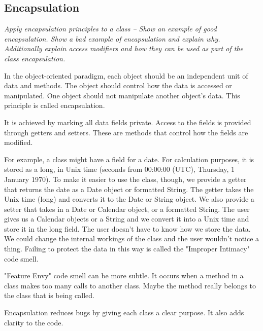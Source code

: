 \subsection{Encapsulation}
\textit{Apply encapsulation principles to a class -- Show an example of good encapsulation.  Show a bad example of encapsulation and explain why.  Additionally explain access modifiers and how they can be used as part of the class encapsulation.}

In the object-oriented paradigm, each object should be an independent unit of data and methods. The object should control how the data is accessed or manipulated. One object should not manipulate another object's data. This principle is called encapsulation.

It is achieved by marking all data fields private. Access to the fields is provided through getters and setters. These are methods that control how the fields are modified. 

For example, a class might have a field for a date. For calculation purposes, it is stored as a long, in Unix time (seconds from 00:00:00 (UTC), Thursday, 1 January 1970). To make it easier to use the class, though, we provide a getter that returns the date as a Date object or formatted String. The getter takes the Unix time (long) and converts it to the Date or String object. We also provide a setter that takes in a Date or Calendar object, or a formatted String. The user gives us a Calendar objects or a String and we convert it into a Unix time and store it in the long field. The user doesn't have to know how we store the data. We could change the internal workings of the class and the user wouldn't notice a thing. Failing to protect the data in this way is called the "Improper Intimacy" code smell\cite{codesmells}.

"Feature Envy" code smell can be more subtle. It occurs when a method in a class makes too many calls to another class. Maybe the method really belongs to the class that is being called\cite{codesmells}.

Encapsulation reduces bugs by giving each class a clear purpose. It also adds clarity to the code.
